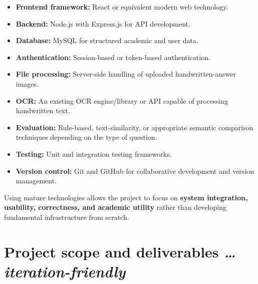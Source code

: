\documentclass[11pt,a4paper]{article}
\newcommand{\BvrHint}[1]{%
  {\normalfont\normalsize\itshape\hfill #1}}
\begin{document}
\begin{itemize}
    \item \textbf{Frontend framework:} React or equivalent modern web technology.

    \item \textbf{Backend:} Node.js with Express.js for API development.

    \item \textbf{Database:} MySQL for structured academic and user data.

    \item \textbf{Authentication:} Session-based or token-based authentication.

    \item \textbf{File processing:} Server-side handling of uploaded handwritten-answer images.

    \item \textbf{OCR:} An existing OCR engine/library or API capable of processing handwritten text.

    \item \textbf{Evaluation:} Rule-based, text-similarity, or appropriate semantic comparison techniques depending on the type of question.

    \item \textbf{Testing:} Unit and integration testing frameworks.

    \item \textbf{Version control:} Git and GitHub for collaborative development and version management.
\end{itemize}

Using mature technologies allows the project to focus on \textbf{system integration, usability, correctness, and academic utility} rather than developing fundamental infrastructure from scratch.

\section{Project scope and deliverables %
\BvrHint{\ldots iteration-friendly}}
\end{document}
